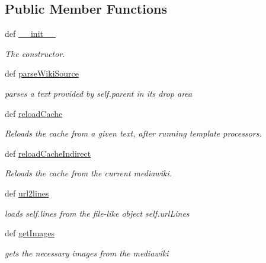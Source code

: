\subsection*{\-Public \-Member \-Functions}
\begin{DoxyCompactItemize}
\item 
def \hyperlink{classuicilibris_1_1wikiParser_1_1wikiParser_aa8c6f57cf7318e3add9818ed1c0d7acf}{\-\_\-\-\_\-init\-\_\-\-\_\-}
\begin{DoxyCompactList}\small\item\em \-The constructor. \end{DoxyCompactList}\item 
def \hyperlink{classuicilibris_1_1wikiParser_1_1wikiParser_ab8d2d05435d90a4f72b59e2c49dff14b}{parse\-Wiki\-Source}
\begin{DoxyCompactList}\small\item\em parses a text provided by self.\-parent in its drop area \end{DoxyCompactList}\item 
def \hyperlink{classuicilibris_1_1wikiParser_1_1wikiParser_aa2ad4f2c68118fbea7e8a6c51c9dc279}{reload\-Cache}
\begin{DoxyCompactList}\small\item\em \-Reloads the cache from a given text, after running template processors. \end{DoxyCompactList}\item 
def \hyperlink{classuicilibris_1_1wikiParser_1_1wikiParser_a3b0221e81ad81da455d765545a4fb008}{reload\-Cache\-Indirect}
\begin{DoxyCompactList}\small\item\em \-Reloads the cache from the current mediawiki. \end{DoxyCompactList}\item 
def \hyperlink{classuicilibris_1_1wikiParser_1_1wikiParser_af38e5cea885aed2b7fbaec3e3a682109}{url2lines}
\begin{DoxyCompactList}\small\item\em loads self.\-lines from the file-\/like object self.\-url\-Lines \end{DoxyCompactList}\item 
def \hyperlink{classuicilibris_1_1wikiParser_1_1wikiParser_a77ab07ac16780aab2763686a8a9a8fb9}{get\-Images}
\begin{DoxyCompactList}\small\item\em gets the necessary images from the mediawiki \end{DoxyCompactList}\item 

\end{DoxyCompactItemize}
